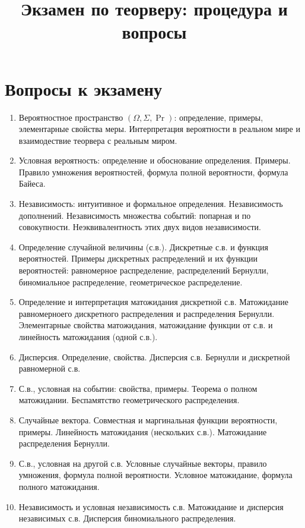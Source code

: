 \documentclass[12pt]{article}
\title{Экзамен по теорверу: процедура и вопросы}
\begin{document}
\maketitle

\section{Вопросы к экзамену}

\begin{enumerate}
  \item Вероятностное пространство $(\Omega, \Sigma, \Pr)$: определение, примеры, элементарные свойства меры. Интерпретация вероятности в реальном мире и взаимодествие теорвера с реальным миром.
  \item Условная вероятность: определение и обоснование определения. Примеры. Правило умножения вероятностей, формула полной вероятности, формула Байеса.
  \item Независимость: интуитивное и формальное определения. Независимость дополнений. Независимость множества событий: попарная и по совокупности. Неэквивалентность этих двух видов независимости.
  \item Определение случайной величины (с.в.). Дискретные с.в. и функция вероятностей. Примеры дискретных распределений и их функции вероятностей: равномерное распределение, распределений Бернулли, биномиальное распределение, геометрическое распределение.
  \item Определение и интерпретация матожидания дискретной с.в. Матожидание равномерноего дискретного распределения и распределения Бернулли. Элементарные свойства матожидания, матожидание функции от с.в. и линейность матожидания (одной с.в.).
  \item Дисперсия. Определение, свойства. Дисперсия с.в. Бернулли и дискретной равномерной с.в.
  \item С.в., условная на событии: свойства, примеры. Теорема о полном матожидании. Беспамятство геометрического распределения.
  \item Случайные вектора. Совместная и маргинальная функции вероятности, примеры. Линейность матожидания (нескольких с.в.). Матожидание распределения Бернулли.
  \item С.в., условная на другой с.в. Условные случайные векторы, правило умножения, формула полной вероятности. Условное матожидание, формула полного матожидания.
  \item Независимость и условная независимость с.в. Матожидание и дисперсия независимых с.в. Дисперсия биномиального распределения.

\end{enumerate}
\end{document}
